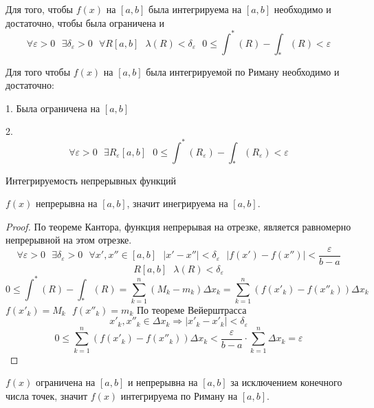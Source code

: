 \begin{block}
  Для того, чтобы $f(x)$ на $[a,b]$ была интегрируема на $[a,b]$ необходимо
  и достаточно, чтобы была ограничена и
  \[
    \forall \varepsilon > 0 ~~~ \exists \delta_\varepsilon > 0 ~~~ \forall R
    [a,b] ~~~ \lambda (R) < \delta_\varepsilon ~~~ 0 \le \int^* (R) -
    \int_* (R) < \varepsilon
  \]
\end{block}

\begin{block}[Замечание]
  Для того чтобы $f(x)$ на $[a,b]$ была интегрируемой по Риману необходимо и
  достаточно:

  1. Была ограничена на $[a,b]$

  2.
  $$
  \forall \varepsilon > 0 ~~~ \exists R_{\varepsilon} [a,b] ~~~
  0 \le \int^*(R_{\varepsilon}) - \int_*(R_{\varepsilon}) < \varepsilon
  $$
\end{block}

\begin{title}[\Large]
  Интегрируемость непрерывных функций
\end{title}

\begin{theorem}
  $f(x)$ непрерывна на $[a,b]$, значит инегрируема на $[a,b]$.
\end{theorem}

\begin{proof}
  По теореме Кантора, функция непрерывая на отрезке, является равномерно
  непрерывной на этом отрезке.
  \[
    \forall \varepsilon > 0 ~~~ \exists \delta_\varepsilon > 0 ~~~ \forall
    x', x'' \in [a,b] ~~~ |x' - x''| < \delta_\varepsilon ~~~
    |f(x') - f(x'')| < \frac{\varepsilon}{b - a}
  \]
  \[R [a,b] ~~~ \lambda (R) < \delta_\varepsilon\]
  \[
    0 \le \int^* (R) - \int_* (R) = \sum_{k = 1}^{n} (M_k - m_k)
    \Delta x_k = \sum_{k = 1}^{n} (f(x'_k) - f(x''_k)) \Delta x_k
  \]
  $f(x'_k) = M_k ~~~ f(x''_k) = m_k$
  По теореме Вейерштрасса
  \[x'_k, x''_k \in \Delta x_k \Rightarrow |x'_k - x'_k| < \delta_\varepsilon\]
  \[
    0 \le \sum_{k = 1}^{n} (f(x'_k) - f(x''_k)) \Delta x_k <
    \frac{\varepsilon}{b - a} \cdot \sum_{k = 1}^{n} \Delta x_k = \varepsilon
  \]
\end{proof}

\begin{theorem}
  $f(x)$ ограничена на $[a,b]$ и непрерывна на $[a,b]$ за исключением конечного
  числа точек, значит $f(x)$ интегрируема по Риману на $[a,b]$.
\end{theorem}

